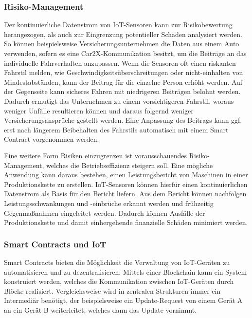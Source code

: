 \subsubsection{Risiko-Management}
\label{sec:Risk_Management}
Der kontinuierliche Datenstrom von IoT-Sensoren kann zur Risikobewertung herangezogen, als auch zur 
Eingrenzung potentieller Schäden analysiert werden.
So können beispielsweise Versicherungsunternehmen die Daten aus einem Auto verwenden, sofern es eine 
Car2X-Kommunikation besitzt, um die Beiträge an das individuelle Fahrverhalten
anzupassen. 
Wenn die Sensoren oft einen riskanten Fahrstil melden, wie Geschwindigkeitsüberschreitungen oder 
nicht-einhalten von Mindestabständen, kann der Beitrag für die einzelne Person erhöht werden. Auf der 
Gegenseite kann sicheres Fahren mit niedrigeren Beiträgen belohnt werden. 
Dadurch ermutigt das Unternehmen zu einem vorsichtigeren Fahrstil, woraus weniger Unfälle resultieren 
können und daraus folgernd weniger Versicherungsansprüche gestellt werden.
\cite[p.~169f]{chowdhary2025smart}
Eine Anpassung des Beitrags kann ggf. erst nach längerem Beibehalten des Fahrstils automatisch mit einem 
Smart Contract vorgenommen werden.

Eine weitere Form Risiken einzugrenzen ist vorausschauendes Risiko-Management, welches die 
Betriebseffizienz steigern soll.
Eine mögliche Anwendung kann daraus bestehen, einen Leistungsbericht von Maschinen in einer Produktionskette
zu erstellen. IoT-Sensoren können hierfür einen kontinuierlichen Datenstrom als Basis für den Bericht liefern.
Aus dem Bericht können nachfolgen Leistungsschwankungen und -einbrüche erkannt werden und frühzeitig 
Gegenmaßnahmen eingeleitet werden. Dadurch können Ausfälle der Produktionskette und damit einhergehende 
finanzielle Schäden minimiert werden.
\cite[p.~169]{chowdhary2025smart}





\subsubsection{Smart Contracts und IoT}
Smart Contracts bieten die Möglichkeit die Verwaltung von IoT-Geräten zu automatisieren und zu dezentralisieren.
Mittels einer Blockchain kann ein System konstruiert werden, welches die Kommunikation zwischen IoT-Geräten
durch Blöcke realisiert. 
Vergleichsweise wird in zentralen Strukturen immer ein Intermediär benötigt, der beispielsweise ein 
Update-Request von einem Gerät A an ein Gerät B weiterleitet, welches dann das Update vornimmt.

